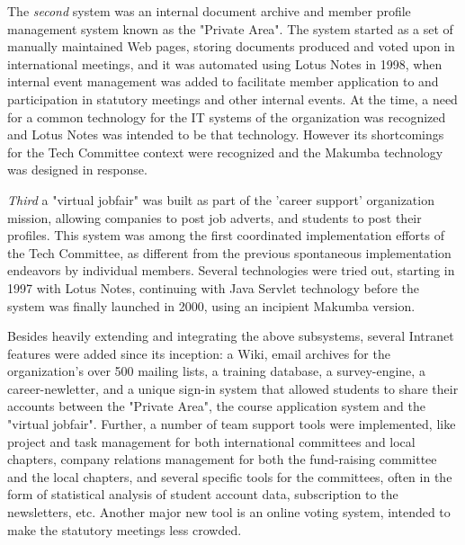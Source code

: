 \documentclass{sig-alt-release2}
\begin{document}
The {\it second} system was an internal document archive and member profile management system known as the "Private Area". The system started as a set of manually maintained Web pages, storing documents produced and voted upon in international meetings, and it was automated using Lotus Notes in 1998, when internal event management was added to facilitate member application to and participation in statutory meetings and other internal events. At the time, a need for a common technology for the IT systems of the organization was recognized and Lotus Notes was intended to be that technology. However its shortcomings for the Tech Committee context were recognized and the Makumba technology was designed in response.

{\it Third} a "virtual jobfair" was built as part of the 'career support' organization mission,  allowing companies to post job adverts, and students to post their profiles. This system was among the first coordinated implementation efforts of the Tech Committee, as different from the previous spontaneous implementation endeavors by individual members. Several technologies were tried out, starting in 1997 with Lotus Notes, continuing with Java Servlet technology before the system was finally launched in 2000, using an incipient Makumba version.

Besides heavily extending and integrating the above subsystems, several Intranet features were added since its inception: a Wiki, email archives for the organization's over 500 mailing lists, a training database, a survey-engine, a career-newletter, and a unique sign-in system that allowed students to share their accounts between the "Private Area", the course application system and the "virtual jobfair". Further, a number of team support tools were implemented, like project and task management for both international committees and local chapters, company relations management for both the fund-raising committee and the local chapters, and several specific tools for the committees, often in the form of statistical analysis of student account data, subscription to the newsletters, etc. Another major new tool is an online voting system, intended to make the statutory meetings less crowded.
\end{document}
